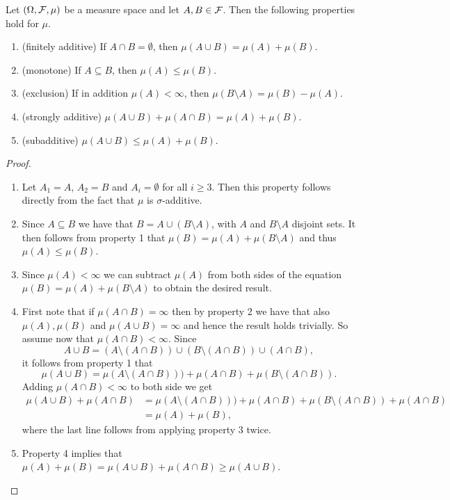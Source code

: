 \begin{proposition}\label{prop:basic_properties_measures}
Let $(\Omega, \mathcal F, \mu)$ be a measure space and let $A, B \in \mathcal F$. Then the following properties hold for $\mu$.
\begin{enumerate}
\item (finitely additive) If $A \cap B = \emptyset$, then $\mu(A \cup B) = \mu(A) + \mu(B)$.
\item (monotone) If $A \subseteq B$, then $\mu(A) \le \mu(B)$.
\item (exclusion) If in addition $\mu(A) < \infty$, then $\mu(B \setminus A) = \mu(B) - \mu(A)$.
\item (strongly additive) $\mu(A \cup B) + \mu(A \cap B) = \mu(A) + \mu(B)$.
\item (subadditive) $\mu(A \cup B) \le \mu(A) + \mu(B)$.
\end{enumerate}
\end{proposition}

\begin{proof}
\hfil
\begin{enumerate}
\item Let $A_1 = A$, $A_2 = B$ and $A_i = \emptyset$ for all $i \ge 3$. Then this property follows directly from the fact that $\mu$ is $\sigma$-additive.
\item Since $A \subseteq B$ we have that $B = A \cup (B \setminus A)$, with $A$ and $B \setminus A$ disjoint sets. It then follows from property 1 that $\mu(B) = \mu(A) + \mu(B \setminus A)$ and thus $\mu(A) \le \mu(B)$.
\item Since $\mu(A) < \infty$ we can subtract $\mu(A)$ from both sides of the equation $\mu(B) = \mu(A) + \mu(B \setminus A)$ to obtain the desired result.
\item First note that if $\mu(A \cap B) = \infty$ then by property 2 we have that also $\mu(A), \mu(B)$ and $\mu(A \cup B) = \infty$ and hence the result holds trivially. So assume now that $\mu(A \cap B) < \infty$. Since 
\[
	A \cup B = (A \setminus (A\cap B)) \cup (B \setminus (A \cap B)) \cup (A \cap B),
\] 
it follows from property 1 that
\[
	\mu(A \cup B) = \mu(A \setminus (A \cap B))) + \mu(A \cap B) + \mu(B \setminus (A \cap B)).
\] 
Adding $\mu(A \cap B) < \infty$ to both side we get
\begin{align*}
	\mu(A \cup B) + \mu(A \cap B) 
	&= \mu(A \setminus (A \cap B))) + \mu(A \cap B) + \mu(B \setminus (A \cap B)) + \mu(A \cap B)\\
	&= \mu(A) + \mu(B), 
\end{align*}
where the last line follows from applying property 3 twice.
\item Property 4 implies that $\mu(A) + \mu(B) = \mu(A \cup B) + \mu(A \cap B) \ge \mu(A \cup B)$.
\end{enumerate}
\end{proof}

